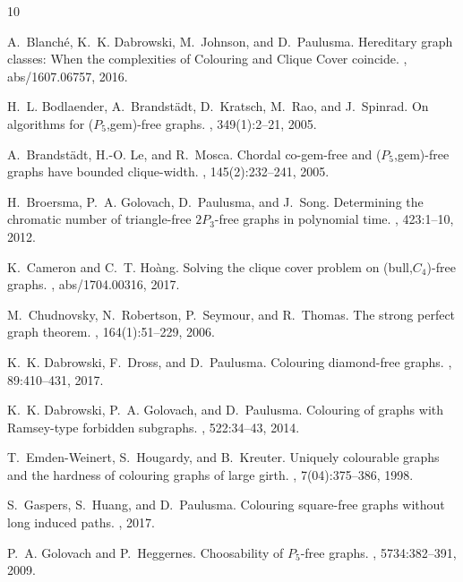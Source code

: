 \documentclass{llncs}
\begin{document}
\begin{thebibliography}{10}

A.~Blanch\'e, K.~K. Dabrowski, M.~Johnson, and D.~Paulusma.
\newblock Hereditary graph classes: When the complexities of {Colouring} and
  {Clique Cover} coincide.
, abs/1607.06757, 2016.

H.~L. Bodlaender, A.~Brandst{\"a}dt, D.~Kratsch, M.~Rao, and J.~Spinrad.
\newblock On algorithms for ({$P_5$},gem)-free graphs.
, 349(1):2--21, 2005.

A.~Brandst{\"a}dt, H.-O. Le, and R.~Mosca.
\newblock Chordal co-gem-free and ({$P_5$},gem)-free graphs have bounded
  clique-width.
, 145(2):232--241, 2005.

H.~Broersma, P.~A. Golovach, D.~Paulusma, and J.~Song.
\newblock Determining the chromatic number of triangle-free {$2P_3$}-free
  graphs in polynomial time.
, 423:1--10, 2012.

K.~Cameron and C.~T. Ho\`ang.
\newblock Solving the clique cover problem on (bull,{$C_4$})-free graphs.
, abs/1704.00316, 2017.

M.~Chudnovsky, N.~Robertson, P.~Seymour, and R.~Thomas.
\newblock The strong perfect graph theorem.
, 164(1):51--229, 2006.

K.~K. Dabrowski, F.~Dross, and D.~Paulusma.
\newblock Colouring diamond-free graphs.
, 89:410--431, 2017.

K.~K. Dabrowski, P.~A. Golovach, and D.~Paulusma.
\newblock Colouring of graphs with {Ramsey-type} forbidden subgraphs.
, 522:34--43, 2014.

T.~Emden-Weinert, S.~Hougardy, and B.~Kreuter.
\newblock Uniquely colourable graphs and the hardness of colouring graphs of
  large girth.
, 7(04):375--386, 1998.

S.~Gaspers, S.~Huang, and D.~Paulusma.
\newblock Colouring square-free graphs without long induced paths.
, 2017.

P.~A. Golovach and P.~Heggernes.
\newblock Choosability of {$P_5$}-free graphs.
, 5734:382--391, 2009.


\end{thebibliography}
\end{document}
